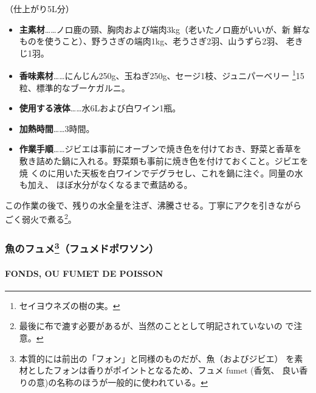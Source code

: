 \begin{recette}
（仕上がり5L分）

\begin{itemize}
\item
  \textbf{主素材}\ldots{}\ldots{}ノロ鹿の頸、胸肉および端肉3kg（老いたノロ鹿がいいが、新
  鮮なものを使うこと）、野うさぎの端肉1kg、老うさぎ2羽、山うずら2羽、
  老きじ1羽。
\item
  \textbf{香味素材}\ldots{}\ldots{}にんじん250g、玉ねぎ250g、セージ1枝、ジュニパーベリー
  \footnote{セイヨウネズの樹の実。}15粒、標準的なブーケガルニ。
\end{itemize}

\begin{itemize}
\item
  \textbf{使用する液体}\ldots{}\ldots{}水6Lおよび白ワイン1瓶。
\item
  \textbf{加熱時間}\ldots{}\ldots{}3時間。
\item
  \textbf{作業手順}\ldots{}\ldots{}ジビエは事前にオーブンで焼き色を付けておき、野菜と香草を
  敷き詰めた鍋に入れる。野菜類も事前に焼き色を付けておくこと。ジビエを焼
  くのに用いた天板を白ワインでデグラセし、これを鍋に注ぐ。同量の水も加え、
  ほぼ水分がなくなるまで煮詰める。
\end{itemize}

この作業の後で、残りの水全量を注ぎ、沸騰させる。丁寧にアクを引きながら
ごく弱火で煮る\footnote{最後に布で漉す必要があるが、当然のこととして明記されていないの
  で注意。}。

\maeaki

\hypertarget{ux9b5aux306eux30d5ux30e5ux30e11010013ux30d5ux30e5ux30e1ux30c9ux30ddux30efux30bdux30f3}{%
\subsubsection[魚のフュメ（フュメドポワソン）]{\texorpdfstring{魚のフュメ\footnote{本質的には前出の「フォン」と同様のものだが、魚（およびジビエ）
  を素材としたフォンは香りがポイントとなるため、フュメ fumet (香気、
  良い香りの意)の名称のほうが一般的に使われている。}（フュメドポワソン）}{魚のフュメ（フュメドポワソン）}}\label{ux9b5aux306eux30d5ux30e5ux30e11010013ux30d5ux30e5ux30e1ux30c9ux30ddux30efux30bdux30f3}}

\hypertarget{fumet-de-poisson}{%
\paragraph{FONDS, OU FUMET DE POISSON}\label{fumet-de-poisson}}



\end{recette}
